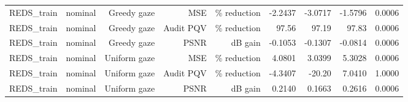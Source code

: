 \begin{table}[t]
\begin{tabular}{llrrrrrrr}
REDS\_train & nominal & Greedy gaze & MSE & \% reduction & -2.2437 & -3.0717 & -1.5796 & 0.0006 \\
REDS\_train & nominal & Greedy gaze & Audit PQV & \% reduction & 97.56 & 97.19 & 97.83 & 0.0006 \\
REDS\_train & nominal & Greedy gaze & PSNR & dB gain & -0.1053 & -0.1307 & -0.0814 & 0.0006 \\
REDS\_train & nominal & Uniform gaze & MSE & \% reduction & 4.0801 & 3.0399 & 5.3028 & 0.0006 \\
REDS\_train & nominal & Uniform gaze & Audit PQV & \% reduction & -4.3407 & -20.20 & 7.0410 & 1.0000 \\
REDS\_train & nominal & Uniform gaze & PSNR & dB gain & 0.2140 & 0.1663 & 0.2616 & 0.0006 \\
\bottomrule
\end{tabular}
\end{table}
